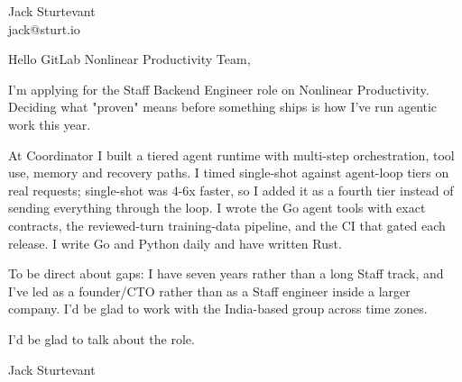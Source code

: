 \documentclass[11pt]{article}
\begin{document}
\raggedright

{\namefont\fontsize{20pt}{24pt}\selectfont Jack Sturtevant}\\[-0.3em]
jack@sturt.io

\vspace{1.2em}

Hello GitLab Nonlinear Productivity Team,

I'm applying for the Staff Backend Engineer role on Nonlinear Productivity. Deciding what "proven" means before something ships is how I've run agentic work this year.

At Coordinator I built a tiered agent runtime with multi-step orchestration, tool use, memory and recovery paths. I timed single-shot against agent-loop tiers on real requests; single-shot was 4-6x faster, so I added it as a fourth tier instead of sending everything through the loop. I wrote the Go agent tools with exact contracts, the reviewed-turn training-data pipeline, and the CI that gated each release. I write Go and Python daily and have written Rust.

To be direct about gaps: I have seven years rather than a long Staff track, and I've led as a founder/CTO rather than as a Staff engineer inside a larger company. I'd be glad to work with the India-based group across time zones.

I'd be glad to talk about the role.

\vspace{0.6em}
Jack Sturtevant
\end{document}

